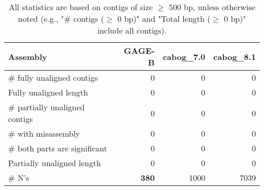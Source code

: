 \documentclass[12pt,a4paper]{article}
\begin{document}
\begin{table}[ht]
\begin{center}
\caption{All statistics are based on contigs of size $\geq$ 500 bp, unless otherwise noted (e.g., "\# contigs ($\geq$ 0 bp)" and "Total length ($\geq$ 0 bp)" include all contigs).}
\begin{tabular}{|l*{3}{|r}|}
\hline
Assembly & GAGE-B & cabog\_7.0 & cabog\_8.1 \\ \hline
\# fully unaligned contigs & 0 & 0 & 0 \\ \hline
Fully unaligned length & 0 & 0 & 0 \\ \hline
\# partially unaligned contigs & 0 & 0 & 0 \\ \hline
\hspace{5mm}\# with misassembly & 0 & 0 & 0 \\ \hline
\hspace{5mm}\# both parts are significant & 0 & 0 & 0 \\ \hline
Partially unaligned length & 0 & 0 & 0 \\ \hline
\# N's & {\bf 380} & 1000 & 7039 \\ \hline
\end{tabular}
\end{center}
\end{table}
\end{document}
